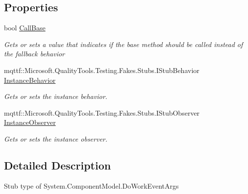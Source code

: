 \subsection*{Properties}
\begin{DoxyCompactItemize}
\item 
bool \hyperlink{class_system_1_1_component_model_1_1_fakes_1_1_stub_do_work_event_args_acce56e501becf585d719fc9cc78f3fec}{Call\-Base}
\begin{DoxyCompactList}\small\item\em Gets or sets a value that indicates if the base method should be called instead of the fallback behavior\end{DoxyCompactList}\item 
mqttf\-::\-Microsoft.\-Quality\-Tools.\-Testing.\-Fakes.\-Stubs.\-I\-Stub\-Behavior \hyperlink{class_system_1_1_component_model_1_1_fakes_1_1_stub_do_work_event_args_af162bf37274326174ab79b0bb3647a6c}{Instance\-Behavior}
\begin{DoxyCompactList}\small\item\em Gets or sets the instance behavior.\end{DoxyCompactList}\item 
mqttf\-::\-Microsoft.\-Quality\-Tools.\-Testing.\-Fakes.\-Stubs.\-I\-Stub\-Observer \hyperlink{class_system_1_1_component_model_1_1_fakes_1_1_stub_do_work_event_args_ad2e53299162cff3cdae8ca52ec92b924}{Instance\-Observer}
\begin{DoxyCompactList}\small\item\em Gets or sets the instance observer.\end{DoxyCompactList}\end{DoxyCompactItemize}


\subsection{Detailed Description}
Stub type of System.\-Component\-Model.\-Do\-Work\-Event\-Args



